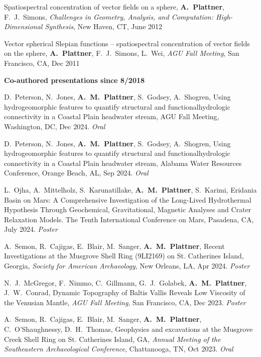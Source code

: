 \documentclass[10pt]{article}
\begin{document}
\spcp
Spatiospectral concentration of vector fields on a sphere,
\textbf{A.~Plattner}, F.~J.~Simons,
\emph{Challenges in Geometry, Analysis, and Computation: High-Dimensional Synthesis}, 
New Haven, CT, June 2012

\spcp
Vector spherical Slepian functions -- spatiospectral concentration of vector fields on the sphere,
\textbf{A.~Plattner}, F.~J.~Simons, L.~Wei,
\emph{AGU Fall Meeting}, San Francisco, CA, Dec 2011


\spc
\textbf{\tsize Co-authored presentations since 8/2018}


\spcp D.\ Peterson, N.\ Jones, \textbf{A.\ M.\ Plattner}, S.\ Godsey,
A.\ Shogren, Using hydrogeomorphic features to quantify structural and
functionalhydrologic connectivity in a Coastal Plain headwater stream,
AGU Fall Meeting, Washington, DC, Dec 2024. \emph{Oral}

\spcp D.\ Peterson, N.\ Jones, \textbf{A.\ M.\ Plattner}, S.\ Godsey, A.\ Shogren, Using hydrogeomorphic features to quantify structural and functionalhydrologic connectivity in a Coastal Plain headwater stream, Alabama Water Resources Conference, Orange Beach, AL, Sep 2024. \emph{Oral}

\spcp
L.\ Ojha, A.\ Mittelholz, S.\ Karunatillake, \textbf{A.\ M.\ Plattner}, S.\ Karimi, Eridania Basin on Mars: A Comprehensive Investigation of the Long-Lived Hydrothermal Hypothesis Through Geochemical, Gravitational, Magnetic Analyses and Crater Relaxation Models. The Tenth International Conference on Mars, Pasadena, CA, July 2024. \emph{Poster}

\spcp A.\ Semon, R.\ Cajigas, E.\ Blair, M.\ Sanger, \textbf{A.\ M.\ Plattner}, Recent Investigations at the Musgrove Shell Ring (9LI2169) on St. Catherines Island, Georgia, \emph{Society for American Archaeology}, New Orleans, LA, Apr 2024. \emph{Poster}

\spcp N.~J.~McGregor, F.~Nimmo, C.~Gillmann, G.~J.~Golabek, \textbf{A.~M.~Plattner}, J.~W.~Conrad, Dynamic Topography of Baltis Vallis Reveals Low Viscosity of the Venusian Mantle, \emph{AGU Fall Meeting}, San Francisco, CA, Dec 2023. \emph{Poster}

\spcp
A.~Semon, R.~Cajigas, E.~Blair, M.~Sanger, \textbf{A.~M.~Plattner}, C.~O'Shaughnessy, D.~H.~Thomas, Geophysics and excavations at the Musgrove Creek Shell Ring on St. Catherines Island, GA, \emph{Annual Meeting of the Southeastern Archaeological Conference}, Chattanooga, TN, Oct 2023. \emph{Oral}
\end{document}
